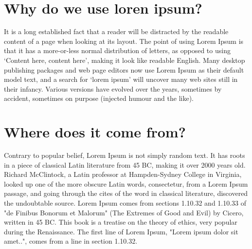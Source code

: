 \nomenclature[C]{$\pi$}{ $\simeq 3.14\ldots$}                                             %


\section{Why do we use loren ipsum?} %


It is a long established fact that a reader will be distracted by the readable content of a page when looking at its layout. The point of using Lorem Ipsum is that it has a more-or-less normal distribution of letters, as opposed to using `Content here, content here', making it look like readable English. Many desktop publishing packages and web page editors now use Lorem Ipsum as their default model text, and a search for `lorem ipsum' will uncover many web sites still in their infancy. Various versions have evolved over the years, sometimes by accident, sometimes on purpose (injected humour and the like).

\section{Where does it come from?}  %
\label{section1.3}

Contrary to popular belief, Lorem Ipsum is not simply random text. It has roots in a piece of classical Latin literature from 45 BC, making it over 2000 years old. Richard McClintock, a Latin professor at Hampden-Sydney College in Virginia, looked up one of the more obscure Latin words, consectetur, from a Lorem Ipsum passage, and going through the cites of the word in classical literature, discovered the undoubtable source. Lorem Ipsum comes from sections 1.10.32 and 1.10.33 of "de Finibus Bonorum et Malorum" (The Extremes of Good and Evil) by Cicero, written in 45 BC. This book is a treatise on the theory of ethics, very popular during the Renaissance. The first line of Lorem Ipsum, "Lorem ipsum dolor sit amet..", comes from a line in section 1.10.32.

